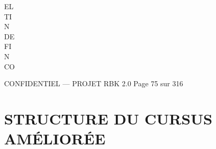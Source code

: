 \vspace{0.5em}
\vspace{0.5em}
EL\\
TI\\
N\\
DE\\
FI\\
N\\
CO\\
\vspace{0.5em}
\vspace{0.5em}
\vspace{0.5em}
\vspace{0.5em}
\begin{confidential}CONFIDENTIEL — PROJET RBK 2.0                               Page 75 sur 316\end{confidential}
\section{STRUCTURE DU CURSUS AMÉLIORÉE}
\vspace{0.5em}
\vspace{0.5em}
